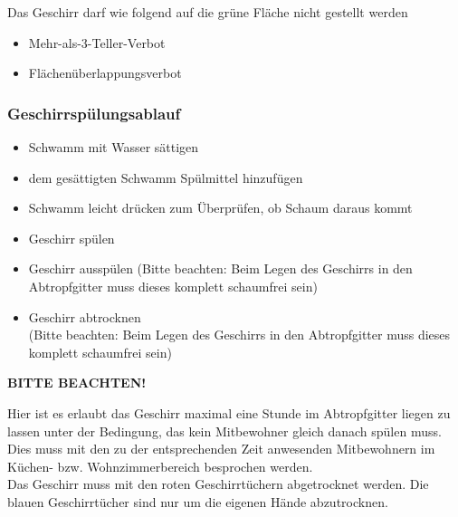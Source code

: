\documentclass[10pt,a4paper,final]{article}
\begin{document}
Das Geschirr darf wie folgend auf die grüne Fläche nicht gestellt werden

\begin{itemize}
\item Mehr-als-3-Teller-Verbot
\item Flächenüberlappungsverbot
\end{itemize}

\subsubsection{Geschirrspülungsablauf}

\begin{itemize}
\item Schwamm mit Wasser sättigen\\


\item dem gesättigten Schwamm Spülmittel hinzufügen\\

\item Schwamm leicht drücken zum Überprüfen, ob Schaum daraus kommt\\

\item Geschirr spülen\\

\item Geschirr ausspülen (Bitte beachten: Beim Legen des Geschirrs in den Abtropfgitter muss dieses komplett schaumfrei sein)\\

\item Geschirr abtrocknen\\(Bitte beachten: Beim Legen des Geschirrs in den Abtropfgitter muss dieses komplett schaumfrei sein)\\

\end{itemize}
\newpage

\centerline{\huge \bf BITTE BEACHTEN!}
\vspace{1cm}
\noindent Hier ist es erlaubt das Geschirr maximal eine Stunde im Abtropfgitter liegen zu lassen unter der Bedingung, das kein Mitbewohner gleich danach spülen muss. Dies muss mit den zu der entsprechenden Zeit anwesenden Mitbewohnern im Küchen- bzw. Wohnzimmerbereich besprochen werden.\\
Das Geschirr muss mit den roten Geschirrtüchern abgetrocknet werden. Die blauen Geschirrtücher sind nur um die eigenen Hände abzutrocknen.\\
\end{document}
